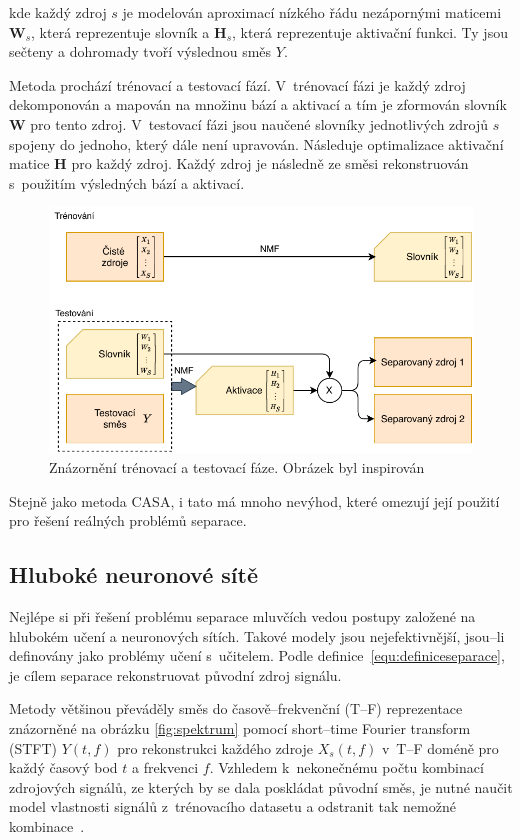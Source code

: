 kde každý zdroj $s$ je modelován aproximací nízkého řádu nezápornými maticemi $\textbf{W}_s$, která reprezentuje slovník a $\textbf{H}_s$, která reprezentuje aktivační funkci. Ty jsou sečteny a dohromady tvoří výslednou směs $Y$.

Metoda prochází trénovací a testovací fází.
V~trénovací fázi je každý zdroj dekomponován a mapován na množinu bází a aktivací a tím je zformován slovník $\textbf{W}$ pro tento zdroj.
V~testovací fázi jsou naučené slovníky jednotlivých zdrojů $s$ spojeny do jednoho, který dále není upravován. Následuje optimalizace aktivační matice $\textbf{H}$ pro každý zdroj. Každý zdroj je následně ze směsi rekonstruován s~použitím výsledných bází a aktivací.

\begin{figure}[H]
    \centering
    \includegraphics[scale=0.9]{obrazky-figures/nmf.pdf}
    \caption{\label{fig:nmf}Znázornění trénovací a testovací fáze. Obrázek byl inspirován~\cite{speechseparation}}
\end{figure}

Stejně jako metoda CASA, i tato má mnoho nevýhod, které omezují její použití pro řešení reálných problémů separace.



\subsection{Hluboké neuronové sítě}
Nejlépe si při řešení problému separace mluvčích vedou postupy založené na hlubokém učení a neuronových sítích. Takové modely jsou nejefektivnější, jsou--li definovány jako problémy učení s~učitelem. Podle definice~\ref{equ:definiceseparace}, je cílem separace rekonstruovat původní zdroj signálu.

Metody většinou převáděly směs do časově--frekvenční (T--F) reprezentace znázorněné na obrázku \ref{fig:spektrum} pomocí short--time Fourier transform (STFT) $Y(t,f)$ pro rekonstrukci každého zdroje $X_s(t,f)$ v~T--F doméně pro každý časový bod $t$ a frekvenci $f$. Vzhledem k~nekonečnému počtu kombinací zdrojových signálů, ze kterých by se dala poskládat původní směs, je nutné naučit model vlastnosti signálů z~trénovacího datasetu a odstranit tak nemožné kombinace~\cite{cocktailparty}.

